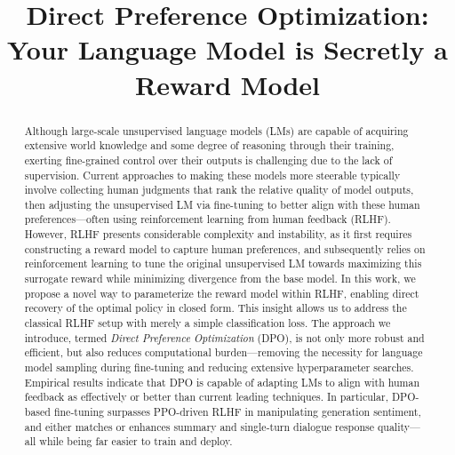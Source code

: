 \title{Direct Preference Optimization: Your Language Model is Secretly a Reward Model}

\begin{abstract}
Although large-scale unsupervised language models (LMs) are capable of acquiring extensive world knowledge and some degree of reasoning through their training, exerting fine-grained control over their outputs is challenging due to the lack of supervision. Current approaches to making these models more steerable typically involve collecting human judgments that rank the relative quality of model outputs, then adjusting the unsupervised LM via fine-tuning to better align with these human preferences—often using reinforcement learning from human feedback (RLHF). However, RLHF presents considerable complexity and instability, as it first requires constructing a reward model to capture human preferences, and subsequently relies on reinforcement learning to tune the original unsupervised LM towards maximizing this surrogate reward while minimizing divergence from the base model. In this work, we propose a novel way to parameterize the reward model within RLHF, enabling direct recovery of the optimal policy in closed form. This insight allows us to address the classical RLHF setup with merely a simple classification loss. The approach we introduce, termed \textit{Direct Preference Optimization} (DPO), is not only more robust and efficient, but also reduces computational burden—removing the necessity for language model sampling during fine-tuning and reducing extensive hyperparameter searches. Empirical results indicate that DPO is capable of adapting LMs to align with human feedback as effectively or better than current leading techniques. In particular, DPO-based fine-tuning surpasses PPO-driven RLHF in manipulating generation sentiment, and either matches or enhances summary and single-turn dialogue response quality—all while being far easier to train and deploy.
\end{abstract}

